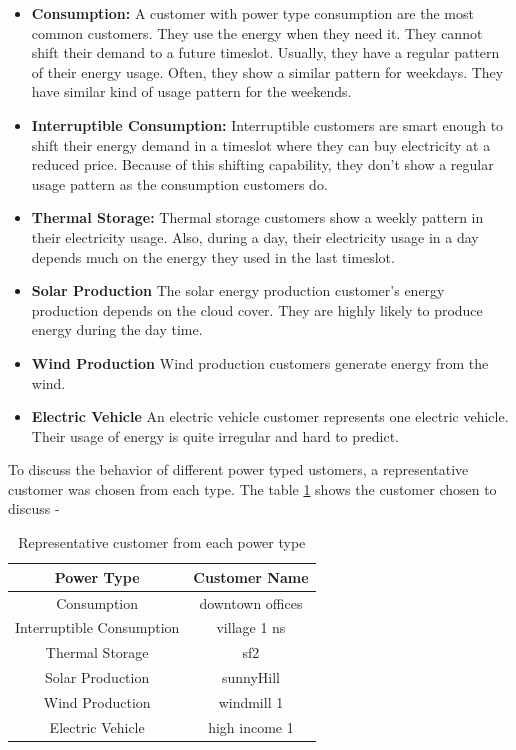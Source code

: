 \begin{itemize}
\item \textbf{Consumption: } A customer with power type consumption are the most common customers. They use the energy when they need it. They cannot shift their demand to a future timeslot. Usually, they have a regular pattern of their energy usage. Often, they show a similar pattern for weekdays. They have similar kind of usage pattern for the weekends. 



\item \textbf{Interruptible Consumption: }
Interruptible customers are smart enough to shift their energy demand in a timeslot where they can buy electricity at a reduced price. Because of this shifting capability, they don't show a regular usage pattern as the consumption customers do. 

\item \textbf{Thermal Storage: }
Thermal storage customers show a weekly pattern in their electricity usage. Also, during a day, their electricity usage in a day depends  much on the energy they used in the last timeslot. 


\item \textbf{Solar Production}
The solar energy production customer's energy production depends on the cloud cover. They are highly likely to produce energy during the day time.

\item\textbf{Wind Production} Wind production customers generate energy from the wind.
\item \textbf{Electric Vehicle} An electric vehicle customer represents one electric vehicle. Their usage of energy is quite irregular and hard to predict. \\
\end{itemize}

 To discuss the behavior of different power typed ustomers, a representative customer was chosen from each type. The table \ref{table:repCust} shows the customer chosen to discuss -

\begin{table}
\centering
\begin{tabular}{ |c|c| } 
\hline
Power Type & Customer Name \\
\hline
Consumption & downtown offices \\ 
Interruptible Consumption & village 1 ns \\ 
Thermal Storage & sf2 \\ 
Solar Production & sunnyHill \\ 
Wind Production & windmill 1 \\ 
Electric Vehicle & high income 1 \\ 
\hline
\end{tabular}
\caption{Representative customer from each power type}
\label{table:repCust}
\end{table}

